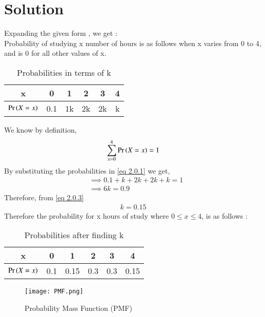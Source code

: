 \documentclass[journal,12pt,twocolumn]{IEEEtran}
\begin{document}
\section{Solution}
 Expanding the given form , we get :\\
 Probability of studying x number of hours is as follows when x varies from 0 to 4, and is 0 for all other values of x.\vspace{3mm}
 \begin{center}
  
  \begin{table}[ht]
  
  \centering
  \begin{tabular}{|c|c|c|c|c|c|}
    \hline
    x &  0 & 1 & 2 & 3 & 4\\
    \hline
    $\Pr\left(X=x\right)$ & 0.1& 1k & 2k & 2k & k\\
    \hline
    
\end{tabular} 
\caption{Probabilities in terms of k }
\end{table}
\end{center}
We know by definition,
\begin{align}
    \sum_{x = 0}^4 \Pr\left(X = x\right) = 1 \label{eq 2.0.1}
\end{align}
By substituting the probabilities in \eqref{eq 2.0.1} we get,
\begin{align}
& \implies 0.1 + k + 2k + 2k + k = 1 \\
& \implies 6k = 0.9 \label{eq 2.0.3}
\end{align}
Therefore, from \eqref{eq 2.0.3}
\begin{align}
    k = 0.15
\end{align}
  Therefore the probability for x hours of study where \(0 \leq x \leq 4\), is as follows :
  
  \begin{table}[ht]
  
  \centering
  \begin{tabular}{|c|c|c|c|c|c|}
    \hline
    x &  0 & 1 & 2 & 3 & 4\\
    \hline
    $\Pr\left(X=x\right)$ & 0.1& 0.15& 0.3 & 0.3 & 0.15\\
    \hline
    
\end{tabular} 
\caption{Probabilities after finding k}
\end{table}

\begin{figure}[ht]
    \centering
    \texttt{[image: PMF.png]}
    \caption{Probability Mass Function (PMF)}
    \label{Figure_1}
\end{figure}
\end{document}
